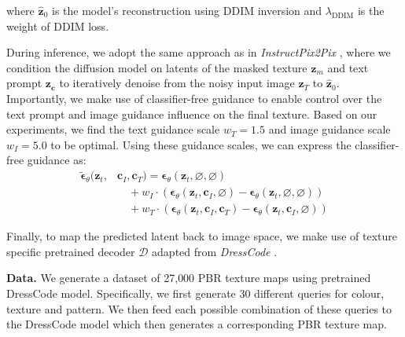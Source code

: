 \documentclass[11pt,twocolumn]{article}
\begin{document}
where $\hat{\mathbf{z}}_0$ is the model's reconstruction using DDIM inversion \cite{ddim} and $\lambda_{\text{DDIM}}$ is the weight of DDIM loss.

During inference, we adopt the same approach as in \textit{InstructPix2Pix} \cite{instructpix2pix}, 
where we condition the diffusion model on latents of the masked texture $\mathbf{z}_m$ and text prompt 
$\mathbf{z_c}$ to iteratively denoise from the noisy input image $\mathbf{z}_T$ to $\hat{\mathbf{z}}_0$. 
Importantly, we make use of classifier-free guidance \cite{cfg} to enable control over the text prompt and 
image guidance influence on the final texture. Based on our experiments, we find the text guidance scale $w_T = 1.5$ 
and image guidance scale $w_I = 5.0$ to be optimal. Using these guidance scales, we can express the classifier-free guidance as:
\vspace{0.0em}
\begin{align*}
  \tilde{\boldsymbol{\epsilon}}_{\theta}(\mathbf{z}_t, &\mathbf{c}_I, \mathbf{c}_T) = \boldsymbol{\epsilon}_{\theta}(\mathbf{z}_t, \varnothing, \varnothing) \\
  &\quad + w_I \cdot \left( \boldsymbol{\epsilon}_{\theta}(\mathbf{z}_t, \mathbf{c}_I, \varnothing) - \boldsymbol{\epsilon}_{\theta}(\mathbf{z}_t, \varnothing, \varnothing) \right) \tag{5} \\
  &\quad + w_T \cdot \left( \boldsymbol{\epsilon}_{\theta}(\mathbf{z}_t, \mathbf{c}_I, \mathbf{c}_T) - \boldsymbol{\epsilon}_{\theta}(\mathbf{z}_t, \mathbf{c}_I, \varnothing) \right)
\end{align*}


Finally, to map the predicted latent back to image space, we make use of texture specific pretrained 
decoder $\mathcal{D}$ adapted from \textit{DressCode} \cite{dresscode}.


\textbf{Data.} We generate a dataset of 27{,}000 PBR texture maps using pretrained DressCode \cite{dresscode} model. Specifically,
we first generate 30 different queries for colour, texture and pattern. We then feed each possible combination of these
queries to the DressCode model which then generates a corresponding PBR texture map.



\end{document}
